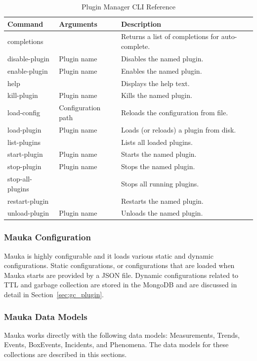 \begin{table}[H]
	\centering
	\caption{Plugin Manager CLI Reference}
	\begin{tabularx}{\textwidth}{llX}
		\toprule
		\textbf{Command} & \textbf{Arguments} & \textbf{Description} \\
		\midrule
		completions & & Returns a list of completions for auto-complete. \\
		disable-plugin & Plugin name & Disables the named plugin. \\
		enable-plugin & Plugin name & Enables the named plugin. \\
		help & & Displays the help text. \\
		kill-plugin & Plugin name & Kills the named plugin. \\
		load-config & Configuration path & Reloads the configuration from file. \\
		load-plugin & Plugin name & Loads (or reloads) a plugin from disk. \\
		list-plugins & & Lists all loaded plugins. \\
		start-plugin & Plugin name & Starts the named plugin. \\
		stop-plugin & Plugin name & Stops the named plugin. \\
		stop-all-plugins & & Stops all running plugins. \\
		restart-plugin & & Restarts the named plugin. \\
		unload-plugin & Plugin name & Unloads the named plugin. \\
		\bottomrule
	\end{tabularx}
	\label{table:PluginManager}
\end{table}

\subsubsection{Mauka Configuration}
Mauka is highly configurable and it loads various static and dynamic configurations. Static configurations, or configurations that are loaded when Mauka starts are provided by a JSON file. Dynamic configurations related to TTL and garbage collection are stored in the MongoDB and are discussed in detail in Section~\ref{sec:gc_plugin}.

\subsubsection{Mauka Data Models}
Mauka works directly with the following data models: Measurements, Trends, Events, BoxEvents, Incidents, and Phenomena. The data models for these collections are described in this sections.

